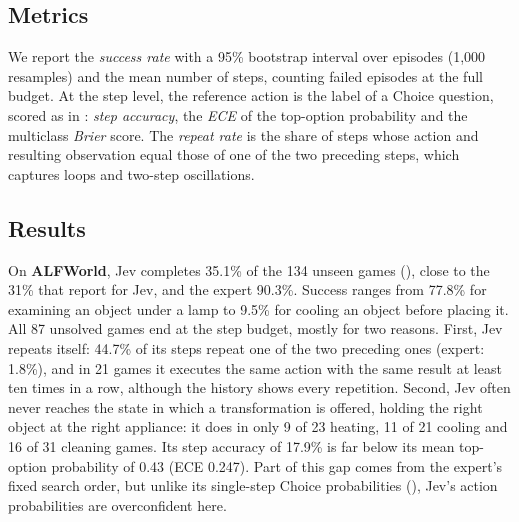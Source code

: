 \documentclass[table]{article}
\begin{document}
\subsection{Metrics}
\label{sec:sequential-metrics}

We report the \emph{success rate} with a 95\% bootstrap interval over episodes (1{,}000 resamples) and the mean number of steps, counting failed episodes at the full budget. At the step level, the reference action is the label of a Choice question, scored as in : \emph{step accuracy}, the \emph{ECE} of the top-option probability and the multiclass \emph{Brier} score. The \emph{repeat rate} is the share of steps whose action and resulting observation equal those of one of the two preceding steps, which captures loops and two-step oscillations.

\subsection{Results}
\label{sec:sequential-results}

\begin{table}[t]
\centering
\caption{Results on the sequential tasks. Success: share of episodes completed within the step budget, with 95\% bootstrap CI. Steps: mean steps per episode. Step acc., ECE and Brier: per-step agreement with the reference action and calibration of the action distribution against it. Repeats: share of steps that repeat one of the two preceding steps. Expert and solver rows: the reference policy of ALFWorld, BabyAI-Text and TextWorld playing on its own. For Blackjack, the optimal policy and a policy that hits only below 12 serve as references, for FrozenLake the optimal policy and a policy that samples moves uniformly. Repeats are not reported for FrozenLake, where moving against a wall is part of optimal play.}
\label{tab:sequential-results}
\footnotesize
\setlength{\tabcolsep}{4pt}

\end{table}

On \textbf{ALFWorld}, Jev completes 35.1\% of the 134 unseen games (), close to the 31\% that \citet{yang2026code} report for Jev, and the expert 90.3\%. Success ranges from 77.8\% for examining an object under a lamp to 9.5\% for cooling an object before placing it. All 87 unsolved games end at the step budget, mostly for two reasons. First, Jev repeats itself: 44.7\% of its steps repeat one of the two preceding ones (expert: 1.8\%), and in 21 games it executes the same action with the same result at least ten times in a row, although the history shows every repetition. Second, Jev often never reaches the state in which a transformation is offered, holding the right object at the right appliance: it does in only 9 of 23 heating, 11 of 21 cooling and 16 of 31 cleaning games. Its step accuracy of 17.9\% is far below its mean top-option probability of 0.43 (ECE 0.247). Part of this gap comes from the expert's fixed search order, but unlike its single-step Choice probabilities (), Jev's action probabilities are overconfident here.
\end{document}
